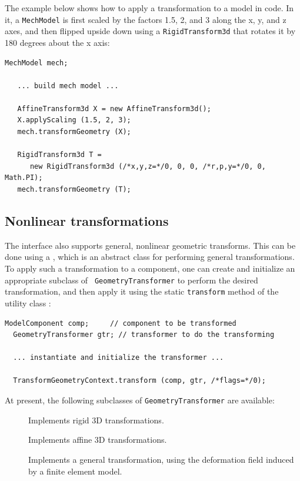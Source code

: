 The example below shows how to apply a transformation to a model in
code. In it, a {\tt MechModel} is first scaled by the factors 1.5, 2,
and 3 along the x, y, and z axes, and then flipped upside down using a
{\tt RigidTransform3d} that rotates it by 180 degrees about the x
axis:
%
\begin{lstlisting}[]
   MechModel mech;

   ... build mech model ...

   AffineTransform3d X = new AffineTransform3d();
   X.applyScaling (1.5, 2, 3);
   mech.transformGeometry (X);
   
   RigidTransform3d T = 
      new RigidTransform3d (/*x,y,z=*/0, 0, 0, /*r,p,y=*/0, 0, Math.PI);
   mech.transformGeometry (T);
\end{lstlisting}
%

\subsection{Nonlinear transformations}

The 
interface also supports general, nonlinear geometric transforms.
This can be done using a
, which is an
abstract class for performing general transformations.  To apply such
a transformation to a component, one can create and initialize an appropriate
subclass of {\tt
GeometryTransformer} to perform the desired transformation, and
then apply it using the static {\tt transform} method of the utility class 
:
%
\begin{lstlisting}[]
  ModelComponent comp;     // component to be transformed
  GeometryTransformer gtr; // transformer to do the transforming

  ... instantiate and initialize the transformer ...

  TransformGeometryContext.transform (comp, gtr, /*flags=*/0);
\end{lstlisting}
%

At present, the following subclasses of {\tt GeometryTransformer} are
available:

\begin{description}

\item[]\mbox{}

Implements rigid 3D transformations.

\item[]\mbox{}

Implements affine 3D transformations.

\item[]\mbox{}

Implements a general transformation, using the deformation field
induced by a finite element model. 

\end{description}

